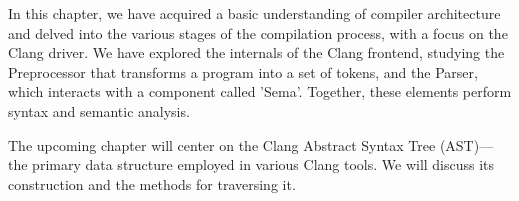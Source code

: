 In this chapter, we have acquired a basic understanding of compiler architecture and delved into the various stages of the compilation process, with a focus on the Clang driver. We have explored the internals of the Clang frontend, studying the Preprocessor that transforms a program into a set of tokens, and the Parser, which interacts with a component called ’Sema’. Together, these elements perform syntax and semantic analysis.

The upcoming chapter will center on the Clang Abstract Syntax Tree (AST)—the primary data structure employed in various Clang tools. We will discuss its construction and the methods for traversing it.